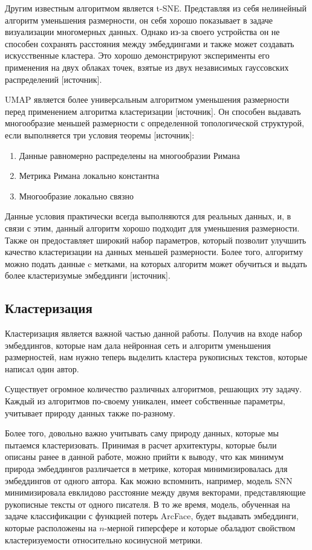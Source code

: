 Другим известным алгоритмом является t-SNE. Представляя из себя нелинейный алгоритм уменьшения размерности, он себя хорошо показывает в задаче визуализации многомерных данных. Однако из-за своего устройства он не способен сохранять расстояния между эмбеддингами и также может создавать искусственные кластера. Это хорошо демонстрируют эксперименты его применения на двух облаках точек, взятые из двух независимых гауссовских распределений [источник].

UMAP является более универсальным алгоритмом уменьшения размерности перед применением алгоритма кластеризации [источник]. Он способен выдавать многообразие меньшей размерности с определенной топологической структурой, если выполняется три условия теоремы [источник]:

\begin{enumerate}
    \item Данные равномерно распределены на многообразии Римана
    \item Метрика Римана локально константна
    \item Многообразие локально связно 
\end{enumerate}

Данные условия практически всегда выполняются для реальных данных, и, в связи с этим, данный алгоритм хорошо подходит для уменьшения размерности. Также он предоставляет широкий набор параметров, который позволит улучшить качество кластеризации на данных меньшей размерности. Более того, алгоритму можно подать данные c метками, на которых алгоритм может обучиться и выдать более кластеризумые эмбеддинги [источник].

\subsection{Кластеризация}

Кластеризация является важной частью данной работы. Получив на входе набор эмбеддингов, которые нам дала нейронная сеть и алгоритм уменьшения размерностей, нам нужно теперь выделить кластера рукописных текстов, которые написал один автор. 

Существует огромное количество различных алгоритмов, решающих эту задачу. Каждый из алгоритмов по-своему уникален, имеет собственные параметры, учитывает природу данных также по-разному. 

Более того, довольно важно учитывать саму природу данных, которые мы пытаемся кластеризовать. Принимая в расчет архитектуры, которые были описаны ранее в данной работе, можно прийти к выводу, что как минимум природа эмбеддингов различается в метрике, которая минимизировалась для эмбеддингов от одного автора. Как можно вспомнить, например, модель SNN минимизировала евклидово расстояние между двумя векторами, представляющие рукописные тексты от одного писателя. В то же время, модель, обученная на задаче классификации с функцией потерь ArcFace, будет выдавать эмбеддинги, которые расположены на $n$-мерной гиперсфере и которые обаладют свойством кластеризуемости относительно косинусной метрики.


